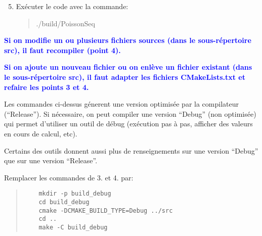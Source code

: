 \documentclass{beamer}
\begin{document}
\begin{frame}
	\begin{enumerate}
  		\setcounter{enumi}{4}
		\item Ex\'ecuter le code avec la commande:
		\begin{quote}
			./build/PoissonSeq
		\end{quote}
	\end{enumerate}

\vfill
\textcolor{blue}{\bf Si on modifie un ou plusieurs fichiers sources (dans le sous-r\'epertoire src), il faut recompiler (point 4).}
\vfill

\textcolor{blue}{\bf Si on ajoute un nouveau fichier ou on enl\`eve un fichier existant (dans le sous-r\'epertoire src), il faut adapter les fichiers CMakeLists.txt et refaire les points 3 et 4.}
\vfill

\end{frame}

\begin{frame}[fragile]
\vfill
Les commandes ci-dessus g\'enerent une version optimis\'ee par la compilateur (``Release''). Si n\'ecessaire, on peut compiler une version ``Debug'' (non optimis\'ee)
qui permet d'utiliser un outil de d\'ebug (ex\'ecution pas \`a pas, afficher des valeurs en cours de calcul, etc).
\vfill

Certains des outils donnent aussi plus de renseignements sur une version ``Debug'' que sur une version ``Release''.
\vfill

Remplacer les commandes de 3. et 4. par:
	\begin{quote}
	\begin{verbatim}
	mkdir -p build_debug
	cd build_debug
	cmake -DCMAKE_BUILD_TYPE=Debug ../src
	cd ..
	make -C build_debug
	\end{verbatim}
\end{quote}
\vfill

\end{frame}
\end{document}
